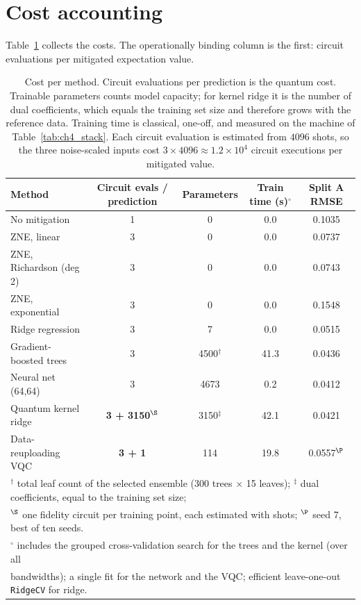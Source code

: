 \documentclass[Thesis.tex]{subfiles}
\begin{document}
\section{Cost accounting}\label{sec:ch5_cost}

Table~\ref{tab:ch5_cost} collects the costs. The operationally binding column is the
first: circuit evaluations per mitigated expectation value.

\begin{table}[htbp]
\centering
\caption[Cost per method]{Cost per method. Circuit evaluations per prediction is the quantum cost.
Trainable parameters counts model capacity; for kernel ridge it is the number of
dual coefficients, which equals the training set size and therefore grows with the
reference data. Training time is classical, one-off, and measured on the machine of
Table~\ref{tab:ch4_stack}. Each circuit evaluation is estimated from $4096$ shots, so
the three noise-scaled inputs cost $3 \times 4096 \approx 1.2 \times 10^{4}$ circuit
executions per mitigated value.}
\label{tab:ch5_cost}
\small
\begin{tabular}{lcccc}
\toprule
\textbf{Method} & \textbf{Circuit evals / prediction} & \textbf{Parameters}
& \textbf{Train time (s)}$^{\circ}$ & \textbf{Split A RMSE} \\
\midrule
No mitigation           & 1 & 0    & 0.0  & 0.1035 \\
ZNE, linear             & 3 & 0    & 0.0  & 0.0737 \\
ZNE, Richardson (deg 2) & 3 & 0    & 0.0  & 0.0743 \\
ZNE, exponential        & 3 & 0    & 0.0  & 0.1548 \\
Ridge regression        & 3 & 7    & 0.0  & 0.0515 \\
Gradient-boosted trees  & 3 & 4500$^{\dagger}$ & 41.3 & 0.0436 \\
Neural net (64,64)      & 3 & 4673 & 0.2  & 0.0412 \\
Quantum kernel ridge    & \textbf{3 + 3150}$^{\S}$ & 3150$^{\ddagger}$ & 42.1 & 0.0421 \\
Data-reuploading VQC    & \textbf{3 + 1} & 114  & 19.8 & 0.0557$^{\P}$ \\
\bottomrule
\multicolumn{5}{l}{\footnotesize $^{\dagger}$ total leaf count of the selected ensemble (300 trees $\times$ 15 leaves);
$^{\ddagger}$ dual coefficients, equal to the training set size;}\\
\multicolumn{5}{l}{\footnotesize $^{\S}$ one fidelity circuit per training point,
each estimated with shots; $^{\P}$ seed 7, best of ten seeds.}\\
\multicolumn{5}{l}{\footnotesize $^{\circ}$ includes the grouped cross-validation search for the trees and the kernel (over all}\\
\multicolumn{5}{l}{\footnotesize \phantom{$^{\circ}$} bandwidths); a single fit for the network and the VQC; efficient leave-one-out \texttt{RidgeCV} for ridge.}
\end{tabular}
\end{table}
\end{document}
